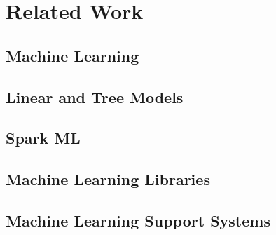 \chapter{Related Work}
\section{Machine Learning}

\section{Linear and Tree Models}

\section{Spark ML}

\section{Machine Learning Libraries}

\section{Machine Learning Support Systems}
